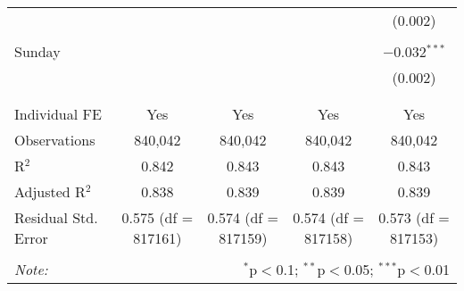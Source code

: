 \documentclass[
]{article}
\begin{document}
\begin{table}[!htbp]
{\begin{tabular}{@{\extracolsep{5pt}}lcccc}
  &  &  &  & (0.002) \\ 
  & & & & \\ 
 Sunday &  &  &  & $-$0.032$^{***}$ \\ 
  &  &  &  & (0.002) \\ 
  & & & & \\ 
\hline \\[-1.8ex] 
Individual FE & Yes & Yes & Yes & Yes \\ 
Observations & 840,042 & 840,042 & 840,042 & 840,042 \\ 
R$^{2}$ & 0.842 & 0.843 & 0.843 & 0.843 \\ 
Adjusted R$^{2}$ & 0.838 & 0.839 & 0.839 & 0.839 \\ 
Residual Std. Error & 0.575 (df = 817161) & 0.574 (df = 817159) & 0.574 (df = 817158) & 0.573 (df = 817153) \\ 
\hline 
\hline \\[-1.8ex] 
\textit{Note:}  & \multicolumn{4}{r}{$^{*}$p$<$0.1; $^{**}$p$<$0.05; $^{***}$p$<$0.01} \\ 
\end{tabular}
} 
\end{table} 
\newpage
\end{document}
